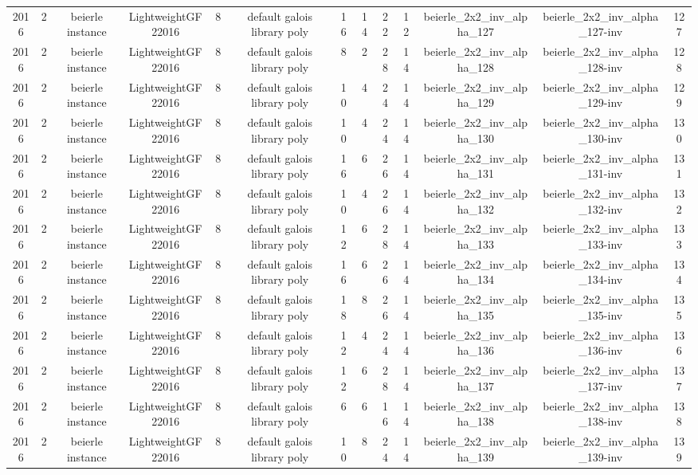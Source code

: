 \begin{tabular}{c c c c c c c c c c c c c}
2016 & 2 & beierle instance & LightweightGF22016 & 8 & default galois library poly & 16 & 14 & 22 & 12 & beierle_2x2_inv_alpha_127 & beierle_2x2_inv_alpha_127-inv & 127 \\
2016 & 2 & beierle instance & LightweightGF22016 & 8 & default galois library poly & 8 & 2 & 28 & 14 & beierle_2x2_inv_alpha_128 & beierle_2x2_inv_alpha_128-inv & 128 \\
2016 & 2 & beierle instance & LightweightGF22016 & 8 & default galois library poly & 10 & 4 & 24 & 14 & beierle_2x2_inv_alpha_129 & beierle_2x2_inv_alpha_129-inv & 129 \\
2016 & 2 & beierle instance & LightweightGF22016 & 8 & default galois library poly & 10 & 4 & 24 & 14 & beierle_2x2_inv_alpha_130 & beierle_2x2_inv_alpha_130-inv & 130 \\
2016 & 2 & beierle instance & LightweightGF22016 & 8 & default galois library poly & 16 & 6 & 26 & 14 & beierle_2x2_inv_alpha_131 & beierle_2x2_inv_alpha_131-inv & 131 \\
2016 & 2 & beierle instance & LightweightGF22016 & 8 & default galois library poly & 10 & 4 & 26 & 14 & beierle_2x2_inv_alpha_132 & beierle_2x2_inv_alpha_132-inv & 132 \\
2016 & 2 & beierle instance & LightweightGF22016 & 8 & default galois library poly & 12 & 6 & 28 & 14 & beierle_2x2_inv_alpha_133 & beierle_2x2_inv_alpha_133-inv & 133 \\
2016 & 2 & beierle instance & LightweightGF22016 & 8 & default galois library poly & 16 & 6 & 26 & 14 & beierle_2x2_inv_alpha_134 & beierle_2x2_inv_alpha_134-inv & 134 \\
2016 & 2 & beierle instance & LightweightGF22016 & 8 & default galois library poly & 18 & 8 & 26 & 14 & beierle_2x2_inv_alpha_135 & beierle_2x2_inv_alpha_135-inv & 135 \\
2016 & 2 & beierle instance & LightweightGF22016 & 8 & default galois library poly & 12 & 4 & 24 & 14 & beierle_2x2_inv_alpha_136 & beierle_2x2_inv_alpha_136-inv & 136 \\
2016 & 2 & beierle instance & LightweightGF22016 & 8 & default galois library poly & 12 & 6 & 28 & 14 & beierle_2x2_inv_alpha_137 & beierle_2x2_inv_alpha_137-inv & 137 \\
2016 & 2 & beierle instance & LightweightGF22016 & 8 & default galois library poly & 6 & 6 & 16 & 14 & beierle_2x2_inv_alpha_138 & beierle_2x2_inv_alpha_138-inv & 138 \\
2016 & 2 & beierle instance & LightweightGF22016 & 8 & default galois library poly & 10 & 8 & 24 & 14 & beierle_2x2_inv_alpha_139 & beierle_2x2_inv_alpha_139-inv & 139 \\

\end{tabular}
